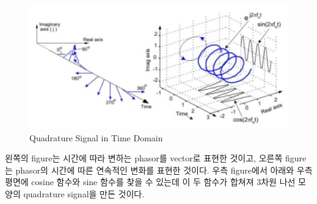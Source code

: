    \vspace{-4mm}  
    \begin{figure}[!h]\centering
		\includegraphics[width=.7\textwidth]{image/week02/2-1-2.png}
		\caption{\small Quadrature Signal in Time Domain}
		\vspace{-10pt}
    \end{figure}
    
    왼쪽의 figure는 시간에 따라 변하는 phasor를 vector로 표현한 것이고, 오른쪽 figure는 phasor의 시간에 따른 연속적인 변화를 표현한 것이다. 우측 figure에서 아래와 우측 평면에 cosine 함수와 sine 함수를 찾을 수 있는데 이 두 함수가 합쳐져 3차원 나선 모양의 quadrature signal을 만든 것이다.
